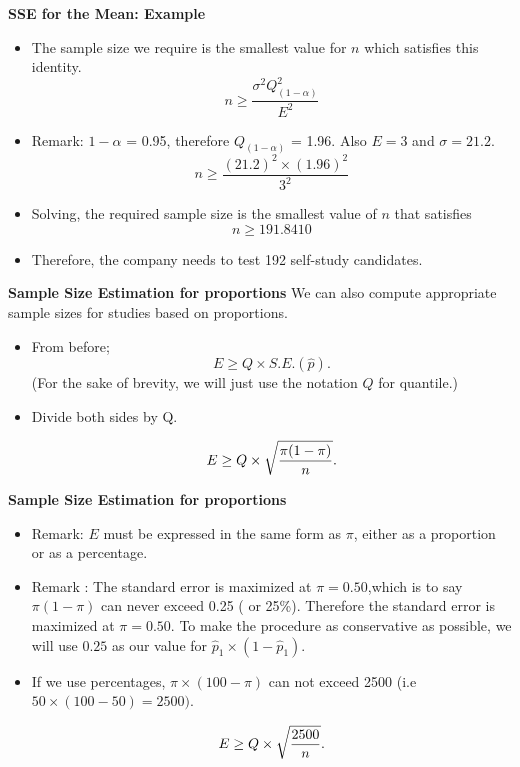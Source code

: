 \documentclass[]{report}
\begin{document}

\textbf{SSE for the Mean: Example}

\begin{itemize}
\item  The sample size we require is the smallest value for $n$ which satisfies this identity.
\[ n \geq \frac{\sigma^2 Q^2_{(1-\alpha)}}{E^2}  \]
\item  Remark: $1-\alpha$ = 0.95, therefore $Q_{(1-\alpha)}$ = 1.96. Also $E=3$ and $\sigma =21.2$.
\[ n \geq \frac{(21.2)^2 \times (1.96)^2}{3^2} \]
\item  Solving, the required sample size is the smallest value of $n$ that satisfies
\[ n \geq 191.8410 \]
\item  Therefore, the company needs to test 192 self-study candidates.
\end{itemize}



\textbf{Sample Size Estimation for proportions}
We can also compute appropriate sample sizes for studies based on proportions.
\begin{itemize}
\item  From before; \[ E \geq Q \times S.E.(\hat{p}). \]
(For the sake of brevity, we will just use the notation $Q$ for quantile.)

\item  Divide both sides by Q.

\[ E \geq Q \times \sqrt{ {\pi(1-\pi)  \over n} }. \]

\end{itemize}



\textbf{Sample Size Estimation for proportions}
\begin{itemize}
\item  Remark: $E$ must be expressed in the same form as $\pi$, either as a proportion or as a percentage.
\item  Remark : The standard error is maximized at $\pi = 0.50$,which is to say $\pi(1-\pi)$ can never exceed 0.25 ( or 25\%). Therefore the standard error is maximized at $\pi = 0.50$. To make the procedure as conservative as possible, we will use $0.25$ as our value for $\hat{p}_1 \times (1 - \hat{p}_1)$.
\item  If we use percentages, $\pi \times (100-\pi)$ can not exceed 2500 (i.e $ 50 \times (100-50)=2500)$.

\[ E \geq Q \times \sqrt{{2500 \over n}}. \]


\end{itemize}
\end{document}
